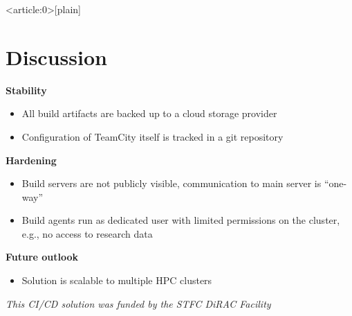 \documentclass[english,11pt]{beamer}
\begin{document}
{ %
    \begin{frame}<article:0>[plain]
     \end{frame}
}

\section{Discussion}
\begin{frame}
 \textbf{Stability}
 \begin{itemize}
  \item All build artifacts are backed up to a cloud storage provider
  \item Configuration of TeamCity itself is tracked in a git repository
  \end{itemize}
  \textbf{Hardening}
  \begin{itemize}
  \item Build servers are not publicly visible, communication to main server is ``one-way''
  \item Build agents run as dedicated  user with limited permissions on the cluster, e.g., no access to research data
 \end{itemize}
 \textbf{Future outlook}

 \begin{itemize}
  \item Solution is scalable to multiple HPC clusters
 \end{itemize}
 \vfill
\emph{This CI/CD solution was funded by the STFC DiRAC Facility}
\end{frame}
\end{document}
